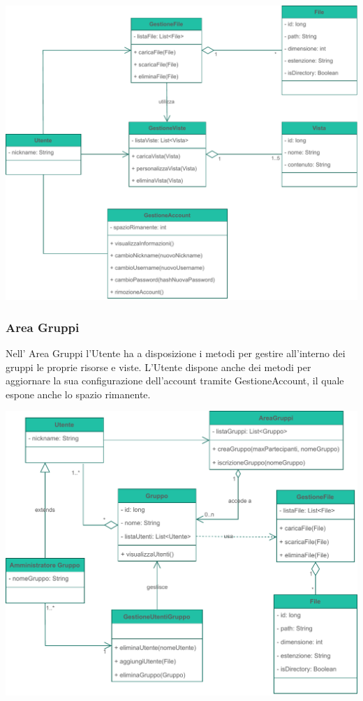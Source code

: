 \begin{adjustwidth}{-2cm}{0cm}
\includegraphics[scale=0.9]{dominio/Dominio-Area Personale.drawio.pdf}
\end{adjustwidth}


\pagebreak
\subsubsection*{Area Gruppi}
{}
\vspace{0.5cm}
Nell' Area Gruppi l'Utente ha a disposizione i metodi per gestire all'interno dei gruppi le proprie risorse e viste. L'Utente dispone anche dei metodi per aggiornare la sua configurazione dell'account tramite GestioneAccount, il quale espone anche lo spazio rimanente.
\vspace{0.5cm}

\begin{adjustwidth}{-2cm}{0cm}
\includegraphics[scale=1]{dominio/Dominio-Area Gruppi.drawio.pdf}
\end{adjustwidth}

